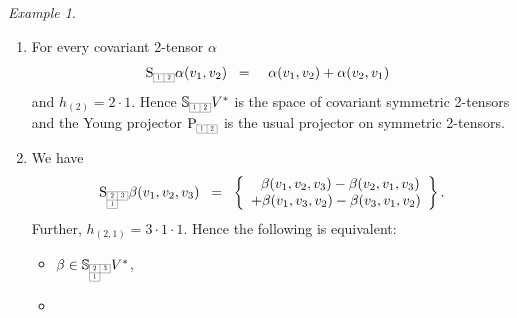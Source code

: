 \documentclass[11pt,a4paper]{article}
\theoremstyle{plain}
\theoremstyle{remark}
\newtheorem{example}{Example}
\newcommand{\rmP}{\mathrm{P}}
\newcommand{\rmS}{\mathrm{S}}
\newcommand{\bbS}{\mathbb{S}}
\begin{document}
\bigskip
\begin{example}\label{ex:Young_symmetrizer}
\begin{enumerate}
\item For every covariant 2-tensor $\alpha$ \begin{equation}\label{eq:Young_(2,0)}
\rmS_{\scaleto{\begin{array}{|c|c|}
\cline{1-2}
1 & 2 \\
\cline{1-2}
\end{array}}{6pt}}\alpha(v_1,v_2) \;\;= \;\;
\begin{array}{c}
\alpha(v_1,v_2)+\alpha(v_2,v_1)
\end{array}
\end{equation} 
and $h_{(2)} = 2\cdot 1$.  Hence $\bbS_{\scaleto{\begin{array}{|c|c|}
\cline{1-2}
1 & 2 \\
\cline{1-2}
\end{array}}{6pt}}V^*$ is the space of covariant symmetric 2-tensors and the Young projector $\rmP_{\scaleto{\begin{array}{|c|c|}
\cline{1-2}
1 & 2 \\
\cline{1-2}
\end{array}}{6pt}}$ is the usual projector on symmetric 2-tensors.
\item
 We have \begin{equation}\label{eq:Young_(2,1)}
\rmS_{\scaleto{\begin{array}{|c|c|}
\cline{1-2}
2 & 3 \\
\cline{1-2}
1 & \multicolumn{1}{c}{} \\
 \cline{1-1}
\end{array}}{12pt}}\beta(v_1,v_2,v_3)\;\;= \;\; \left \lbrace
\begin{array}{c}
\;\  \beta(v_1,v_2,v_3) - \beta(v_2,v_1,v_3)\\
+ \beta(v_1,v_3,v_2) - \beta(v_3,v_1,v_2)
\end{array}\right \rbrace.
\end{equation} 
Further, $h_{(2,1)} = 3\cdot 1\cdot 1$. Hence the following is equivalent:
\begin{itemize}
\item
$
\beta \in \bbS_{\scaleto{\begin{array}{|c|c|}
\cline{1-2}
2 & 3 \\
\cline{1-2}
1 & \multicolumn{1}{c}{} \\
 \cline{1-1}
\end{array}}{12pt}} V^*$,
\item

\end{itemize}
\end{enumerate}
\end{example}
\end{document}
